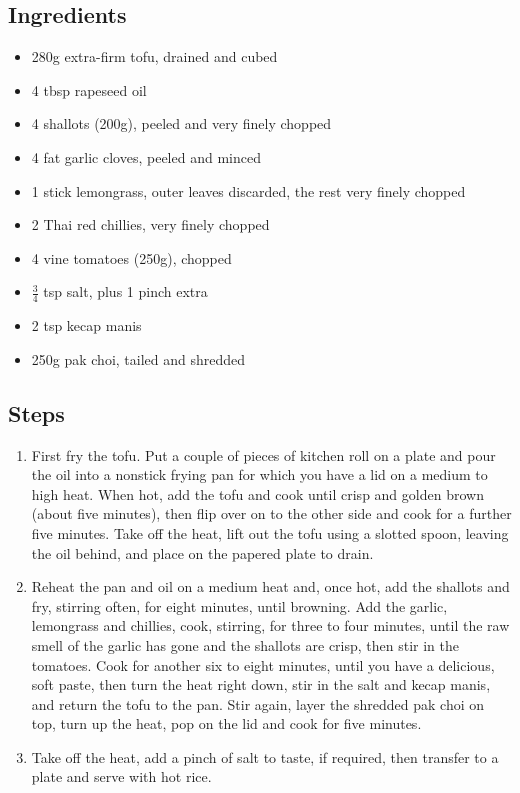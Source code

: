 \documentclass{book}
\begin{document}
\subsection*{Ingredients}
\begin{itemize}
\item 280g extra-firm tofu, drained and cubed
\item 4 tbsp rapeseed oil 
\item 4 shallots (200g), peeled and very finely chopped 
\item 4 fat garlic cloves, peeled and minced 
\item 1 stick lemongrass, outer leaves discarded, the rest very finely chopped
\item 2 Thai red chillies, very finely chopped
\item 4 vine tomatoes (250g), chopped 
\item $\frac{3}{4}$ tsp salt, plus 1 pinch extra
\item 2 tsp kecap manis
\item 250g pak choi, tailed and shredded
\end{itemize}

\subsection*{Steps}
\begin{enumerate}
\item First fry the tofu. Put a couple of pieces of kitchen roll on a plate and pour the oil into a nonstick frying pan for which you have a lid on a medium to high heat. When hot, add the tofu and cook until crisp and golden brown (about five minutes), then flip over on to the other side and cook for a further five minutes. Take off the heat, lift out the tofu using a slotted spoon, leaving the oil behind, and place on the papered plate to drain.
\item Reheat the pan and oil on a medium heat and, once hot, add the shallots and fry, stirring often, for eight minutes, until browning. Add the garlic, lemongrass and chillies, cook, stirring, for three to four minutes, until the raw smell of the garlic has gone and the shallots are crisp, then stir in the tomatoes. Cook for another six to eight minutes, until you have a delicious, soft paste, then turn the heat right down, stir in the salt and kecap manis, and return the tofu to the pan. Stir again, layer the shredded pak choi on top, turn up the heat, pop on the lid and cook for five minutes.
\item Take off the heat, add a pinch of salt to taste, if required, then transfer to a plate and serve with hot rice.
\end{enumerate}
\newpage
\end{document}
